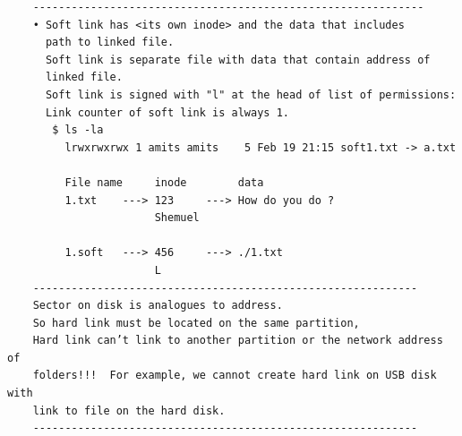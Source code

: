 \documentclass[a4paper,12pt]{article}
\begin{document}
\begin{verbatim}
    -------------------------------------------------------------
    • Soft link has <its own inode> and the data that includes
      path to linked file. 
      Soft link is separate file with data that contain address of 
      linked file.
      Soft link is signed with "l" at the head of list of permissions: 
      Link counter of soft link is always 1.
       $ ls -la         
         lrwxrwxrwx 1 amits amits    5 Feb 19 21:15 soft1.txt -> a.txt
    
         File name     inode        data
         1.txt    ---> 123     ---> How do you do ?
                       Shemuel    
         
         1.soft   ---> 456     ---> ./1.txt
                       L      
    ------------------------------------------------------------
    Sector on disk is analogues to address.
	So hard link must be located on the same partition, 
	Hard link can’t link to another partition or the network address of 	
	folders!!!  For example, we cannot create hard link on USB disk with 
	link to file on the hard disk.
    ------------------------------------------------------------    
           
\end{verbatim}
\end{document}
